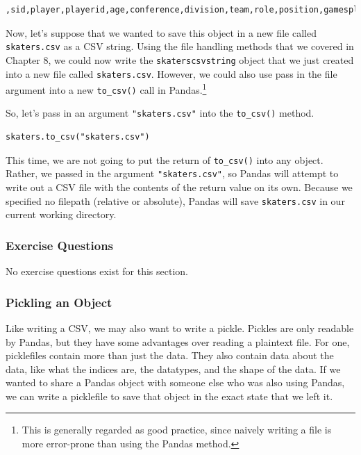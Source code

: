 \begin{lstlisting}[style=none]
,sid,player,playerid,age,conference,division,team,role,position,gamesplayed,cf,ca,cfpct,cfpctrel,ff,fa,ffpct,ffpctrel,toishootpct,toisavepct,pdo,offzonestartpct,defzonestartpct,toi,toieven,takeaways,g
\end{lstlisting}
Now, let's suppose that we wanted to save this object in a new file called \verb|skaters.csv| as a CSV string. Using the file handling methods that we covered in Chapter 8, we could now write the \verb|skaterscsvstring| object that we just created into a new file called \verb|skaters.csv|. However, we could also use pass in the file argument into a new \verb|to_csv()| call in Pandas.\footnote{This is generally regarded as good practice, since naively writing a file is more error-prone than using the Pandas method.}\par
So, let's pass in an argument \verb|"skaters.csv"| into the \verb|to_csv()| method.\par
\begin{lstlisting}[style=pippython]
skaters.to_csv("skaters.csv")
\end{lstlisting}
This time, we are not going to put the return of \verb|to_csv()| into any object. Rather, we passed in the argument \verb|"skaters.csv"|, so Pandas will attempt to write out a CSV file with the contents of the return value on its own. Because we specified no filepath (relative or absolute), Pandas will save \verb|skaters.csv| in our current working directory.\par
{}
\subsubsection*{Exercise Questions}
No exercise questions exist for this section.
\subsubsection{Pickling an Object}
Like writing a CSV, we may also want to write a pickle. Pickles are only readable by Pandas, but they have some advantages over reading a plaintext file. For one, picklefiles contain more than just the data. They also contain data about the data, like what the indices are, the datatypes, and the shape of the data. If we wanted to share a Pandas object with someone else who was also using Pandas, we can write a picklefile to save that object in the exact state that we left it.
